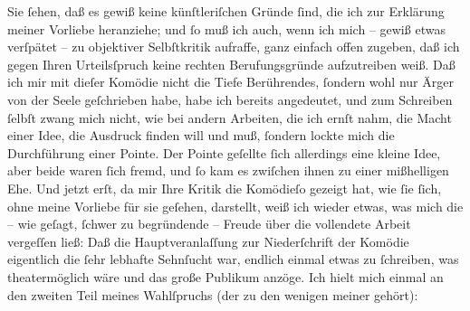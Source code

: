 \begin{ledgroupsized}[t]{13cm}
           \pstart
           Sie ſehen, daß es gewiß keine künſtleriſchen Gründe ſind, die ich zur Erklärung
                    meiner Vorliebe heranziehe; und ſo muß ich auch, wenn {\pb}ich mich – gewiß etwas verſpätet – zu objektiver
                    Selbſtkritik aufraffe, ganz einfach offen zugeben, daß ich gegen Ihren
                    Urteilsſpruch keine rechten Berufungsgründe aufzutreiben weiß. Daß ich mir mit
                    dieſer Komödie nicht die Tiefe Berührendes, ſondern wohl nur Ärger von der Seele
                    geſchrieben habe, habe ich bereits angedeutet, und zum Schreiben ſelbſt zwang
                    mich nicht, wie bei andern Arbeiten, die ich ernſt nahm, die Macht einer Idee,
                    die Ausdruck finden will und muß, ſondern lockte mich die Durchführung einer
                    Pointe. Der Pointe geſellte ſich allerdings eine kleine Idee, aber beide waren
                    ſich fremd, und ſo kam es zwiſchen ihnen zu einer mißhelligen Ehe.\pend
           \pstart
           Und jetzt erſt, da mir Ihre Kritik die Komödieſo gezeigt hat, wie ſie ſich, ohne meine
                    Vorliebe für sie geſehen, darstellt, weiß ich
                    wieder etwas, was mich die – wie geſagt, ſchwer zu begründende – Freude über die
                    vollendete Arbeit vergeſſen ließ: Daß die Hauptveranlaſſung zur Niederſchrift
                    der Komödie eigentlich die ſehr lebhafte Sehnſucht war, endlich einmal etwas zu
                    ſchreiben, was theatermöglich wäre und das große Publikum anzöge. Ich hielt mich
                    einmal an den zweiten Teil meines Wahlſpruchs (der zu den wenigen meiner \label{K_L02215_1v}\label{K_L02215_1h} gehört):\pend

\end{ledgroupsized}
